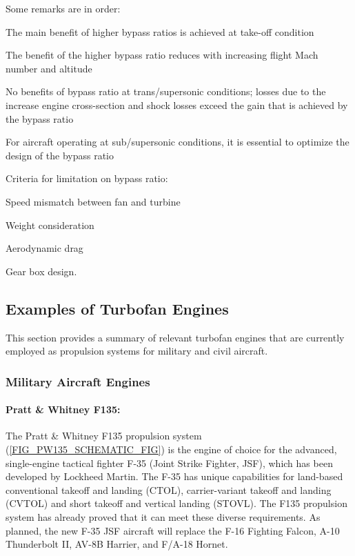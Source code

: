 Some remarks are in order:
\begin{itemizePacked}
\item The main benefit of higher bypass ratios is achieved at take-off condition
\item The benefit of the higher bypass ratio reduces with increasing flight Mach number and altitude
\item No benefits of bypass ratio at trans/supersonic conditions; losses due to the increase engine cross-section and shock losses exceed the gain that is achieved by the bypass ratio
\item For aircraft operating at sub/supersonic conditions, it is essential to optimize the design of the bypass ratio
\item Criteria for limitation on bypass ratio:
  \begin{itemizePacked}
  \item Speed mismatch between fan and turbine
  \item Weight consideration
  \item Aerodynamic drag
  \item Gear box design.
  \end{itemizePacked}
\end{itemizePacked}

\subsection{Examples of Turbofan Engines}
This section provides a summary of relevant turbofan engines that are currently employed as propulsion systems for military and civil aircraft.

\subsubsection{Military Aircraft Engines}

\paragraph{Pratt \& Whitney F135:}
The Pratt \& Whitney F135 propulsion system (\cref{FIG_PW135_SCHEMATIC_FIG}) is the engine of choice for the advanced, single-engine tactical fighter F-35 (Joint Strike Fighter, JSF), which has been developed by Lockheed Martin. The F-35 has unique capabilities for land-based conventional takeoff and landing (CTOL), carrier-variant takeoff and landing (CVTOL) and short takeoff and vertical landing (STOVL). The F135 propulsion system has already proved that it can meet these diverse requirements. As planned, the new F-35 JSF aircraft will replace the F-16 Fighting
Falcon, A-10 Thunderbolt II, AV-8B Harrier, and F/A-18 Hornet.

